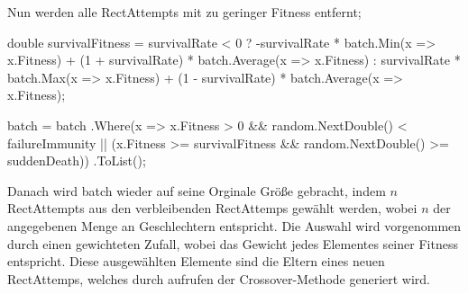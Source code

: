 \documentclass{article}
\begin{document}
\begin{flushleft}
Nun werden alle RectAttempts mit zu geringer Fitness entfernt;
\lstset{
firstnumber=33
}
\begin{Csharp}
double survivalFitness = survivalRate < 0 ? -survivalRate * batch.Min(x => x.Fitness) + (1 + survivalRate) * batch.Average(x => x.Fitness) :
                                             survivalRate * batch.Max(x => x.Fitness) + (1 - survivalRate) * batch.Average(x => x.Fitness);

batch = batch
    .Where(x => x.Fitness > 0 				 && random.NextDouble() < failureImmunity
            || (x.Fitness >= survivalFitness && random.NextDouble() >= suddenDeath))
    .ToList();
\end{Csharp}

Danach wird batch wieder auf seine Orginale Größe gebracht, indem $n$ RectAttempts aus den verbleibenden RectAttemps gewählt werden, wobei $n$ der angegebenen Menge an Geschlechtern entspricht. Die Auswahl wird vorgenommen durch einen gewichteten Zufall, wobei das Gewicht jedes Elementes seiner Fitness entspricht.
Diese ausgewählten Elemente sind die Eltern eines neuen RectAttemps, welches durch aufrufen der Crossover-Methode generiert wird.

\end{flushleft}
\end{document}
